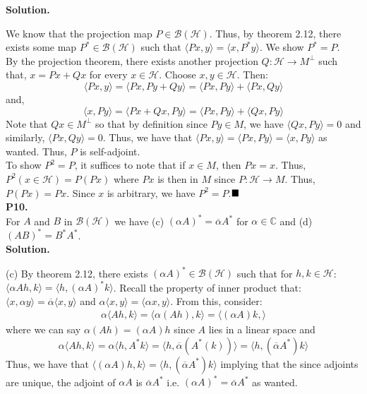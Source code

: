 \documentclass{article}
\begin{document}
    \textbf{Solution.}

    We know that the projection map $P\in\mathcal{B}(\mathcal{H})$. Thus, by theorem 2.12, there exists some map $P^*\in\mathcal{B}
    (\mathcal{H})$ such that $\langle Px,y\rangle = \langle x,P^* y\rangle$. We show $P^* = P$.\\
    By the projection theorem, there exists another projection $Q:\mathcal{H}\to M^{\perp}$ such that,
    $x = Px + Qx$ for every $x\in\mathcal{H}$. Choose $x,y\in\mathcal{H}$. Then:
    \[ \langle Px,y\rangle = \langle Px, Py + Qy\rangle = \langle Px,Py\rangle + \langle Px,Qy\rangle \]
    and,
    \[ \langle x,Py\rangle = \langle Px + Qx,Py\rangle = \langle Px,Py\rangle + \langle Qx,Py\rangle \]
    Note that $Qx\in M^{\perp}$ so that by definition since $Py\in M$, we have $\langle Qx,Py\rangle = 0$ and similarly,
    $\langle Px,Qy\rangle = 0$. Thus, we have that $\langle Px,y\rangle = \langle Px,Py\rangle = \langle x,Py\rangle$ as wanted.
    Thus, $P$ is self-adjoint.\\

    To show $P^2 = P$, it suffices to note that if $x\in M$, then $Px = x$. Thus, $P^2(x\in \mathcal{H}) = P(Px)$ where $Px$ is then
    in $M$ since $P:\mathcal{H}\to M$. Thus, $P(Px) = Px$. Since $x$ is arbitrary, we have $P^2 = P$.$\hfill\blacksquare$\\

    \textbf{P10.}\\

     For $A$ and $B$ in $\mathcal{B}(\mathcal{H})$ we have (c) $(\alpha A)^* = \overline{\alpha}A^*$ for $\alpha\in\mathbb{C}$ and
     (d) $(AB)^* = B^* A^*$.\\

     \textbf{Solution.}

     (c) By theorem 2.12, there exists $(\alpha A)^*\in\mathcal{B}(\mathcal{H})$ such that for $h,k\in\mathcal{H}$:
     $\langle \alpha Ah,k\rangle = \langle h,(\alpha A)^* k\rangle$. Recall the property of inner product that:
     $\langle x,\alpha y\rangle = \overline{\alpha}\langle x,y\rangle$ and $\alpha\langle x,y\rangle =\langle\alpha x,y\rangle$.
     From this, consider:
     \begin{align*}
         \alpha\langle Ah,k\rangle = \langle \alpha(Ah),k\rangle = \langle (\alpha A)k,\rangle
     \end{align*}
     where we can say $\alpha(Ah) = (\alpha A)h$ since $A$ lies in a linear space and
     \[ \alpha\langle Ah,k\rangle = \alpha\langle h,A^* k\rangle = \langle h,\overline{\alpha}(A^*(k))\rangle
         = \langle h,(\overline{\alpha} A^*)k\rangle \]
     Thus, we have that $\langle (\alpha A)h,k\rangle = \langle h,(\overline{\alpha}A^*)k\rangle$ implying that the since adjoints
     are unique, the adjoint of $\alpha A$ is $\overline{\alpha} A^*$ i.e. $(\alpha A)^* = \overline{\alpha} A^*$ as wanted.
\end{document}

